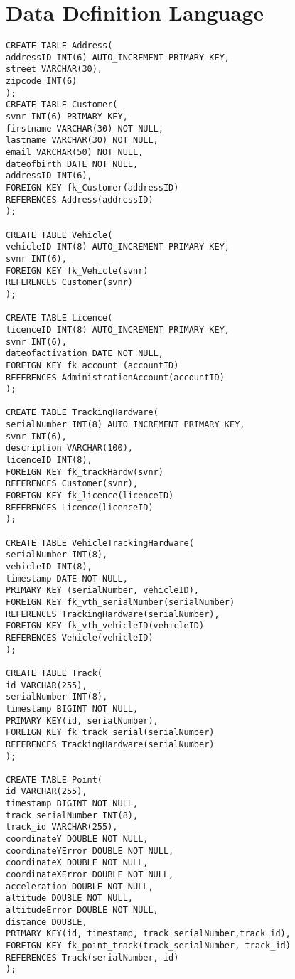 \section{Data Definition Language}
\begin{verbatim}
CREATE TABLE Address(
addressID INT(6) AUTO_INCREMENT PRIMARY KEY,
street VARCHAR(30),
zipcode INT(6)
);
CREATE TABLE Customer(
svnr INT(6) PRIMARY KEY,
firstname VARCHAR(30) NOT NULL,
lastname VARCHAR(30) NOT NULL,
email VARCHAR(50) NOT NULL,
dateofbirth DATE NOT NULL,
addressID INT(6),
FOREIGN KEY fk_Customer(addressID)
REFERENCES Address(addressID)
);

CREATE TABLE Vehicle(
vehicleID INT(8) AUTO_INCREMENT PRIMARY KEY,
svnr INT(6),
FOREIGN KEY fk_Vehicle(svnr)
REFERENCES Customer(svnr)
);

CREATE TABLE Licence(
licenceID INT(8) AUTO_INCREMENT PRIMARY KEY,
svnr INT(6),
dateofactivation DATE NOT NULL,
FOREIGN KEY fk_account (accountID)
REFERENCES AdministrationAccount(accountID)
);

CREATE TABLE TrackingHardware(
serialNumber INT(8) AUTO_INCREMENT PRIMARY KEY,
svnr INT(6),
description VARCHAR(100),
licenceID INT(8),
FOREIGN KEY fk_trackHardw(svnr)
REFERENCES Customer(svnr),
FOREIGN KEY fk_licence(licenceID)
REFERENCES Licence(licenceID)
);

CREATE TABLE VehicleTrackingHardware(
serialNumber INT(8),
vehicleID INT(8),
timestamp DATE NOT NULL,
PRIMARY KEY (serialNumber, vehicleID),
FOREIGN KEY fk_vth_serialNumber(serialNumber)
REFERENCES TrackingHardware(serialNumber),
FOREIGN KEY fk_vth_vehicleID(vehicleID)
REFERENCES Vehicle(vehicleID)
);

CREATE TABLE Track(
id VARCHAR(255),
serialNumber INT(8),
timestamp BIGINT NOT NULL,
PRIMARY KEY(id, serialNumber),
FOREIGN KEY fk_track_serial(serialNumber)
REFERENCES TrackingHardware(serialNumber)
);

CREATE TABLE Point(
id VARCHAR(255),
timestamp BIGINT NOT NULL,
track_serialNumber INT(8),
track_id VARCHAR(255),
coordinateY DOUBLE NOT NULL,
coordinateYError DOUBLE NOT NULL,
coordinateX DOUBLE NOT NULL,
coordinateXError DOUBLE NOT NULL,
acceleration DOUBLE NOT NULL,
altitude DOUBLE NOT NULL,
altitudeError DOUBLE NOT NULL,
distance DOUBLE,
PRIMARY KEY(id, timestamp, track_serialNumber,track_id),
FOREIGN KEY fk_point_track(track_serialNumber, track_id)
REFERENCES Track(serialNumber, id)
);
\end{verbatim}

